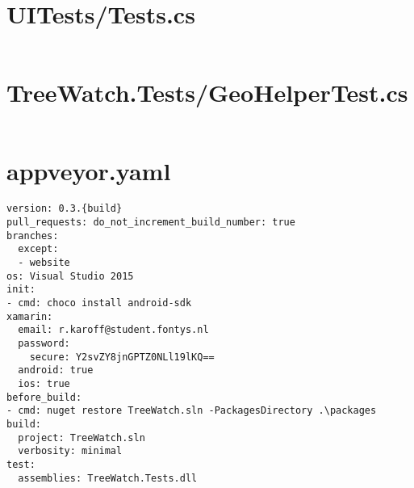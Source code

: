 \documentclass[12pt]{article}
\begin{document}
\pagebreak\section{UITests/Tests.cs}
\inputminted[linenos,firstline=22]{csharp}{../../../src/UITests/Tests.cs}

\pagebreak\section{TreeWatch.Tests/GeoHelperTest.cs}
\inputminted[linenos,firstline=22]{csharp}{../../../src/TreeWatch.Tests/GeoHelperTest.cs}

\pagebreak\section{appveyor.yaml}
\begin{verbatim}
version: 0.3.{build}
pull_requests: do_not_increment_build_number: true
branches:
  except:
  - website
os: Visual Studio 2015
init:
- cmd: choco install android-sdk
xamarin:
  email: r.karoff@student.fontys.nl
  password:
    secure: Y2svZY8jnGPTZ0NLl19lKQ==
  android: true
  ios: true
before_build:
- cmd: nuget restore TreeWatch.sln -PackagesDirectory .\packages
build:
  project: TreeWatch.sln
  verbosity: minimal
test:
  assemblies: TreeWatch.Tests.dll
\end{verbatim}
\end{document}
